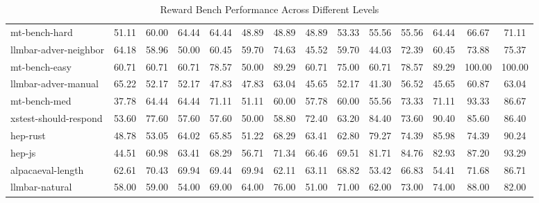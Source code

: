 \begin{table*}[h!]
\begin{tabular}{l|ccccccccccccc}
mt-bench-hard & 51.11 & 60.00 & 64.44 & 64.44 & 48.89 & 48.89 & 48.89 & 53.33 & 55.56 & 55.56 & 64.44 & 66.67 & 71.11 \\
\rowcolor{lightgray} llmbar-adver-neighbor & 64.18 & 58.96 & 50.00 & 60.45 & 59.70 & 74.63 & 45.52 & 59.70 & 44.03 & 72.39 & 60.45 & 73.88 & 75.37 \\
mt-bench-easy & 60.71 & 60.71 & 60.71 & 78.57 & 50.00 & 89.29 & 60.71 & 75.00 & 60.71 & 78.57 & 89.29 & 100.00 & 100.00 \\
\rowcolor{lightgray} llmbar-adver-manual & 65.22 & 52.17 & 52.17 & 47.83 & 47.83 & 63.04 & 45.65 & 52.17 & 41.30 & 56.52 & 45.65 & 60.87 & 63.04 \\
mt-bench-med & 37.78 & 64.44 & 64.44 & 71.11 & 51.11 & 60.00 & 57.78 & 60.00 & 55.56 & 73.33 & 71.11 & 93.33 & 86.67 \\
\rowcolor{lightgray} xstest-should-respond & 53.60 & 77.60 & 57.60 & 57.60 & 50.00 & 58.80 & 72.40 & 63.20 & 84.40 & 73.60 & 90.40 & 85.60 & 86.40 \\
hep-rust & 48.78 & 53.05 & 64.02 & 65.85 & 51.22 & 68.29 & 63.41 & 62.80 & 79.27 & 74.39 & 85.98 & 74.39 & 90.24 \\
\rowcolor{lightgray} hep-js & 44.51 & 60.98 & 63.41 & 68.29 & 56.71 & 71.34 & 66.46 & 69.51 & 81.71 & 84.76 & 82.93 & 87.20 & 93.29 \\
alpacaeval-length & 62.61 & 70.43 & 69.94 & 69.44 & 69.94 & 62.11 & 63.11 & 68.82 & 53.42 & 66.83 & 54.41 & 71.68 & 86.71 \\
\rowcolor{lightgray} llmbar-natural & 58.00 & 59.00 & 54.00 & 69.00 & 64.00 & 76.00 & 51.00 & 71.00 & 62.00 & 73.00 & 74.00 & 88.00 & 82.00 \\
\hline
\end{tabular}
\caption{Reward Bench Performance Across Different Levels}
\label{tab:reward_bench_levels}
\end{table*}